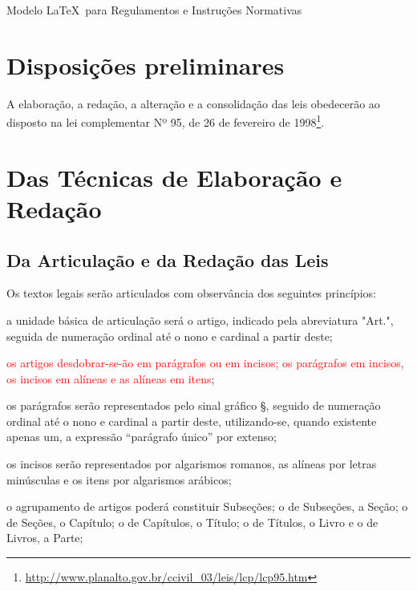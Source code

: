 \documentclass[11pt,twoside,a4paper]{inifsc}
\begin{document}
\begin{normativa}{Modelo \LaTeX~para Regulamentos e Instruções Normativas}

\chapter{Disposições preliminares}

\begin{artigo}
    \item A elaboração, a redação, a alteração e a consolidação das leis obedecerão ao disposto na lei complementar Nº 95, de 26 de fevereiro de 1998\footnote{\url{http://www.planalto.gov.br/ccivil_03/leis/lcp/lcp95.htm}}.

\end{artigo}



\chapter{Das Técnicas de Elaboração e Redação}


\section{Da Articulação e da Redação das Leis}


\begin{artigo}
    \item\label{art:observancia}
    Os textos legais serão articulados com observância dos seguintes princípios:
    \begin{inciso}
        \item\label{inc:formatoartigo}
         a unidade básica de articulação será o artigo, indicado pela abreviatura "Art.", seguida de numeração ordinal até o nono e cardinal a partir deste;
        \item \textcolor{red}{os artigos desdobrar-se-ão em parágrafos ou em incisos; os parágrafos em incisos, os incisos em alíneas e as alíneas em itens};
        \item os parágrafos serão representados pelo sinal gráfico §, seguido de numeração ordinal até o nono e cardinal a partir deste, utilizando-se, quando existente apenas um, a expressão ``parágrafo único'' por extenso;
        \item os incisos serão representados por algarismos romanos, as alíneas por letras minúsculas e os itens por algarismos arábicos;
        \item o agrupamento de artigos poderá constituir Subseções; o de Subseções, a Seção; o de Seções, o Capítulo; o de Capítulos, o Título; o de Títulos, o Livro e o de Livros, a Parte;
    \end{inciso}


\end{artigo}
\end{normativa}
\end{document}
